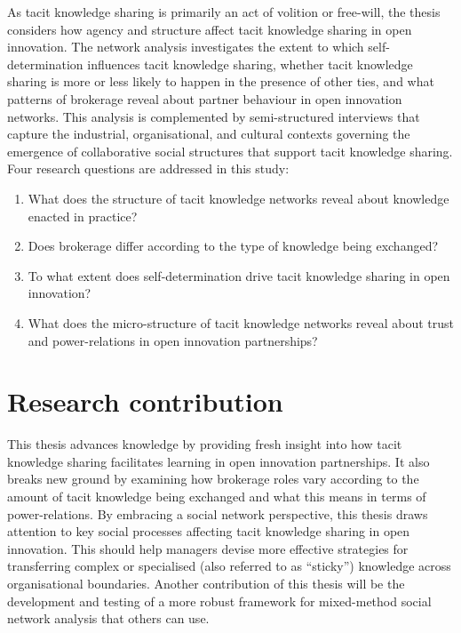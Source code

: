 As tacit knowledge sharing is primarily an act of volition or free-will, the thesis considers how agency and structure affect tacit knowledge sharing in open innovation. The network analysis investigates the extent to which self-determination influences tacit knowledge sharing, whether tacit knowledge sharing is more or less likely to happen in the presence of other ties, and what patterns of brokerage reveal about partner behaviour in open innovation networks. This analysis is complemented by semi-structured interviews that capture the industrial, organisational, and cultural contexts governing the emergence of collaborative social structures that support tacit knowledge sharing. Four research questions are addressed in this study: \medskip

\begin{enumerate}
\item What does the structure of tacit knowledge networks reveal about knowledge enacted in practice?
\item Does brokerage differ according to the type of knowledge being exchanged?
\item To what extent does self-determination drive tacit knowledge sharing in open innovation?
\item What does the micro-structure of tacit knowledge networks reveal about trust and power-relations in open innovation partnerships?
\end{enumerate}

\section{Research contribution}

This thesis advances knowledge by providing fresh insight into how tacit knowledge sharing facilitates learning in open innovation partnerships. It also breaks new ground by examining how brokerage roles vary according to the amount of tacit knowledge being exchanged and what this means in terms of power-relations. By embracing a social network perspective, this thesis draws attention to key social processes affecting tacit knowledge sharing in open innovation. This should help managers devise more effective strategies for transferring complex or specialised (also referred to as \enquote{sticky}) knowledge across organisational boundaries. Another contribution of this thesis will be the development and testing of a more robust framework for mixed-method social network analysis that others can use. 

